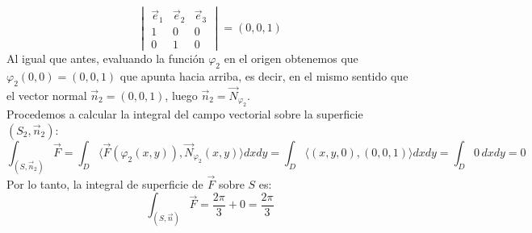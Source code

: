 {\[\begin{vmatrix}
            \vec{e}_1 & \vec{e}_2 & \vec{e}_3 \\
            1         & 0         & 0         \\
            0         & 1         & 0
        \end{vmatrix}
        = (0, 0, 1)
    \]
    Al igual que antes, evaluando la función $\varphi_2$ en el origen obtenemos que
    $\varphi_2(0,0) = (0,0,1)$ que apunta hacia arriba, es decir, en el mismo
    sentido que el vector normal $\vec{n}_2 = (0,0,1)$, luego $\vec{n}_2 =
        \vec{N}_{\varphi_2}$.\\ Procedemos a calcular la integral del campo vectorial
    sobre la superficie $(S_2, \vec{n}_2)$:
    \[
        \int_{(S, \vec{n}_2)} \vec{F} = \int_{D} \langle \vec{F}(\varphi_2(x,y)), \vec{N}_{\varphi_2}(x,y) \rangle dx dy = \int_{D} \langle (x,y,0), (0,0,1) \rangle dx dy = \int_{D} 0 \, dx dy = 0
    \]
    Por lo tanto, la integral de superficie de $\vec{F}$ sobre $S$ es:
    \[
        \int_{(S, \vec{n})} \vec{F} = \frac{2\pi}{3} + 0 = \frac{2\pi}{3}
    \]
}

